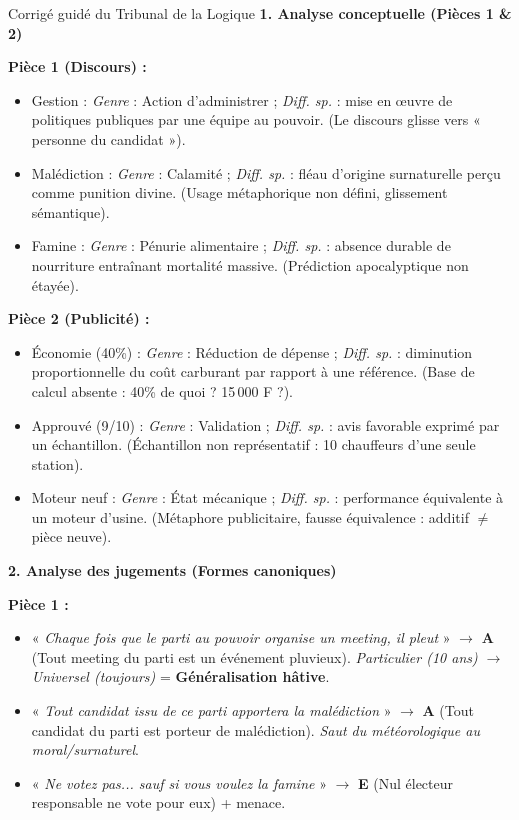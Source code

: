 \documentclass[11pt]{article}
\newcommand{\cle}[1]{{\popxbold\color{popdark}#1}}
\newcounter{popsec}
\newcounter{popsub}
\newcommand{\courssub}[1]{%
  \stepcounter{popsub}%
  \par\vspace{9pt}\noindent{\popxbold\fontsize{11.5}{13}\selectfont\color{popink}{\color{poporange}\thepopsec.\thepopsub}\hspace{6pt}#1}\par\nopagebreak\vspace{4pt}
}
\begin{document}
\courssub{Démarche et corrigé commenté}
\begin{exoresolu}{Corrigé guidé du Tribunal de la Logique}
\textbf{1. Analyse conceptuelle (Pièces 1 \& 2)}

\vspace{0.3em}
\noindent\textbf{Pièce 1 (Discours) :}
\begin{itemize}
    \item \cle{Gestion} : \textit{Genre} : Action d'administrer ; \textit{Diff. sp.} : mise en œuvre de politiques publiques par une équipe au pouvoir. (Le discours glisse vers « personne du candidat »).
    \item \cle{Malédiction} : \textit{Genre} : Calamité ; \textit{Diff. sp.} : fléau d'origine surnaturelle perçu comme punition divine. (Usage métaphorique non défini, glissement sémantique).
    \item \cle{Famine} : \textit{Genre} : Pénurie alimentaire ; \textit{Diff. sp.} : absence durable de nourriture entraînant mortalité massive. (Prédiction apocalyptique non étayée).
\end{itemize}

\noindent\textbf{Pièce 2 (Publicité) :}
\begin{itemize}
    \item \cle{Économie (40\%)} : \textit{Genre} : Réduction de dépense ; \textit{Diff. sp.} : diminution proportionnelle du coût carburant par rapport à une référence. (Base de calcul absente : 40\% de quoi ? 15\,000 F ?).
    \item \cle{Approuvé (9/10)} : \textit{Genre} : Validation ; \textit{Diff. sp.} : avis favorable exprimé par un échantillon. (Échantillon non représentatif : 10 chauffeurs d'une seule station).
    \item \cle{Moteur neuf} : \textit{Genre} : État mécanique ; \textit{Diff. sp.} : performance équivalente à un moteur d'usine. (Métaphore publicitaire, fausse équivalence : additif $\neq$ pièce neuve).
\end{itemize}

\vspace{0.5em}
\noindent\textbf{2. Analyse des jugements (Formes canoniques)}

\vspace{0.3em}
\noindent\textbf{Pièce 1 :}
\begin{itemize}
    \item « \emph{Chaque fois que le parti au pouvoir organise un meeting, il pleut} » $\rightarrow$ \textbf{A} (Tout meeting du parti est un événement pluvieux). \textit{Particulier (10 ans) $\rightarrow$ Universel (toujours)} = \textbf{Généralisation hâtive}.
    \item « \emph{Tout candidat issu de ce parti apportera la malédiction} » $\rightarrow$ \textbf{A} (Tout candidat du parti est porteur de malédiction). \textit{Saut du météorologique au moral/surnaturel}.
    \item « \emph{Ne votez pas... sauf si vous voulez la famine} » $\rightarrow$ \textbf{E} (Nul électeur responsable ne vote pour eux) + menace.
\end{itemize}


\end{exoresolu}
\end{document}
